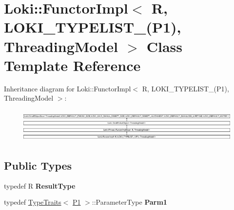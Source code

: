\hypertarget{classLoki_1_1FunctorImpl_3_01R_00_01LOKI__TYPELIST__1_07P1_08_00_01ThreadingModel_01_4}{}\section{Loki\+:\+:Functor\+Impl$<$ R, L\+O\+K\+I\+\_\+\+T\+Y\+P\+E\+L\+I\+S\+T\+\_(P1), Threading\+Model $>$ Class Template Reference}
\label{classLoki_1_1FunctorImpl_3_01R_00_01LOKI__TYPELIST__1_07P1_08_00_01ThreadingModel_01_4}
Inheritance diagram for Loki\+:\+:Functor\+Impl$<$ R, L\+O\+K\+I\+\_\+\+T\+Y\+P\+E\+L\+I\+S\+T\+\_(P1), Threading\+Model $>$\+:\begin{figure}[H]
\begin{center}
\leavevmode
\includegraphics[height=1.751368cm]{classLoki_1_1FunctorImpl_3_01R_00_01LOKI__TYPELIST__1_07P1_08_00_01ThreadingModel_01_4}
\end{center}
\end{figure}
\subsection*{Public Types}
\begin{DoxyCompactItemize}
\item 
\hypertarget{classLoki_1_1FunctorImpl_3_01R_00_01LOKI__TYPELIST__1_07P1_08_00_01ThreadingModel_01_4_a46dffea680f8e65e436d6122b0ce79b8}{}typedef R {\bfseries Result\+Type}\label{classLoki_1_1FunctorImpl_3_01R_00_01LOKI__TYPELIST__1_07P1_08_00_01ThreadingModel_01_4_a46dffea680f8e65e436d6122b0ce79b8}

\item 
\hypertarget{classLoki_1_1FunctorImpl_3_01R_00_01LOKI__TYPELIST__1_07P1_08_00_01ThreadingModel_01_4_a8a4bb9d67ec8de4196a031a974604023}{}typedef \hyperlink{classLoki_1_1TypeTraits}{Type\+Traits}$<$ \hyperlink{structP1}{P1} $>$\+::Parameter\+Type {\bfseries Parm1}\label{classLoki_1_1FunctorImpl_3_01R_00_01LOKI__TYPELIST__1_07P1_08_00_01ThreadingModel_01_4_a8a4bb9d67ec8de4196a031a974604023}

\end{DoxyCompactItemize}
